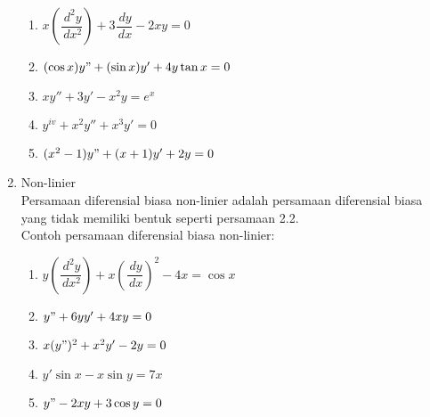 \begin{enumerate}[1.]
	\begin{enumerate}[1.]

		\item \begin{math} x (\dfrac{\, d^{2}y}{\, dx^{2}}) + 3 \dfrac{\, dy}{\, dx} - 2xy = 0 \end{math}
		\item \begin{math} (\cos x) y" + (\sin x)y' + 4y \tan x = 0 \end{math}
		\item \begin{math} xy'' + 3y' - x^{2}y = e^{x}\end{math}
		\item \begin{math} y^{iv}+ x^{2}y'' + x^{3}y' = 0 \end{math}
		\item \begin{math} (x^{2} - 1) y" + (x+1) y' + 2y = 0 \end{math}

	\end{enumerate}

	\item Non-linier
	\\
	Persamaan diferensial biasa non-linier adalah persamaan diferensial biasa yang tidak memiliki bentuk seperti persamaan 2.2.
	\\
	Contoh persamaan diferensial biasa non-linier:

	\begin{enumerate}[1.]

		\item \begin{math} y (\dfrac{\, d^{2}y}{\, dx^{2}}) + x (\dfrac{\, dy}{\, dx})^{2} - 4x = \cos x \end{math}
		\item \begin{math} y" + 6yy' + 4xy = 0 \end{math}
		\item \begin{math} x (y")^{2} + x^{2} y' - 2y = 0\end{math}
		\item \begin{math} y' \sin x - x \sin y = 7x \end{math}
		\item \begin{math} y" - 2xy + 3 \cos y = 0 \end{math}

	\end{enumerate}

\end{enumerate}

